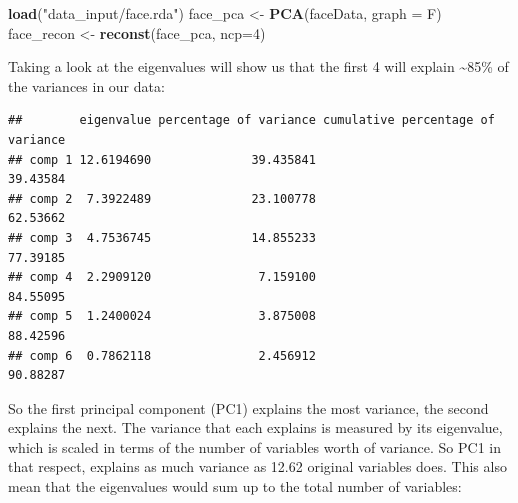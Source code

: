 \documentclass[]{article}
\newenvironment{Shaded}{\begin{snugshade}}{\end{snugshade}}
\newcommand{\DataTypeTok}[1]{\textcolor[rgb]{0.13,0.29,0.53}{#1}}
\newcommand{\DecValTok}[1]{\textcolor[rgb]{0.00,0.00,0.81}{#1}}
\newcommand{\KeywordTok}[1]{\textcolor[rgb]{0.13,0.29,0.53}{\textbf{#1}}}
\newcommand{\NormalTok}[1]{#1}
\newcommand{\OperatorTok}[1]{\textcolor[rgb]{0.81,0.36,0.00}{\textbf{#1}}}
\newcommand{\StringTok}[1]{\textcolor[rgb]{0.31,0.60,0.02}{#1}}
\begin{document}
\begin{Shaded}
\begin{Highlighting}[]
\KeywordTok{load}\NormalTok{(}\StringTok{"data_input/face.rda"}\NormalTok{)}
\NormalTok{face_pca <-}\StringTok{ }\KeywordTok{PCA}\NormalTok{(faceData,  }\DataTypeTok{graph =}\NormalTok{ F)}
\NormalTok{face_recon <-}\StringTok{ }\KeywordTok{reconst}\NormalTok{(face_pca, }\DataTypeTok{ncp=}\DecValTok{4}\NormalTok{)}
\end{Highlighting}
\end{Shaded}

Taking a look at the eigenvalues will show us that the first 4 will
explain \textasciitilde{}85\% of the variances in our data:

\begin{Shaded}
\end{Shaded}

\begin{verbatim}
##        eigenvalue percentage of variance cumulative percentage of variance
## comp 1 12.6194690              39.435841                          39.43584
## comp 2  7.3922489              23.100778                          62.53662
## comp 3  4.7536745              14.855233                          77.39185
## comp 4  2.2909120               7.159100                          84.55095
## comp 5  1.2400024               3.875008                          88.42596
## comp 6  0.7862118               2.456912                          90.88287
\end{verbatim}

So the first principal component (PC1) explains the most variance, the
second explains the next. The variance that each explains is measured by
its eigenvalue, which is scaled in terms of the number of variables
worth of variance. So PC1 in that respect, explains as much variance as
12.62 original variables does. This also mean that the eigenvalues would
sum up to the total number of variables:

\begin{Shaded}
\end{Shaded}
\end{document}
